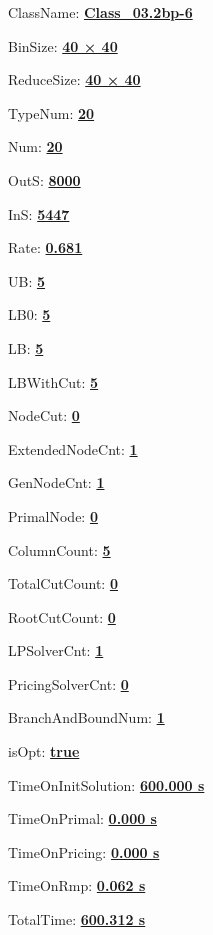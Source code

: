 \documentclass[11pt]{article}
\begin{document}
\pagestyle{empty}


ClassName: \underline{\textbf{Class_03.2bp-6}}
\par
BinSize: \underline{\textbf{40 × 40}}
\par
ReduceSize: \underline{\textbf{40 × 40}}
\par
TypeNum: \underline{\textbf{20}}
\par
Num: \underline{\textbf{20}}
\par
OutS: \underline{\textbf{8000}}
\par
InS: \underline{\textbf{5447}}
\par
Rate: \underline{\textbf{0.681}}
\par
UB: \underline{\textbf{5}}
\par
LB0: \underline{\textbf{5}}
\par
LB: \underline{\textbf{5}}
\par
LBWithCut: \underline{\textbf{5}}
\par
NodeCut: \underline{\textbf{0}}
\par
ExtendedNodeCnt: \underline{\textbf{1}}
\par
GenNodeCnt: \underline{\textbf{1}}
\par
PrimalNode: \underline{\textbf{0}}
\par
ColumnCount: \underline{\textbf{5}}
\par
TotalCutCount: \underline{\textbf{0}}
\par
RootCutCount: \underline{\textbf{0}}
\par
LPSolverCnt: \underline{\textbf{1}}
\par
PricingSolverCnt: \underline{\textbf{0}}
\par
BranchAndBoundNum: \underline{\textbf{1}}
\par
isOpt: \underline{\textbf{true}}
\par
TimeOnInitSolution: \underline{\textbf{600.000 s}}
\par
TimeOnPrimal: \underline{\textbf{0.000 s}}
\par
TimeOnPricing: \underline{\textbf{0.000 s}}
\par
TimeOnRmp: \underline{\textbf{0.062 s}}
\par
TotalTime: \underline{\textbf{600.312 s}}
\par
\newpage


\end{document}
